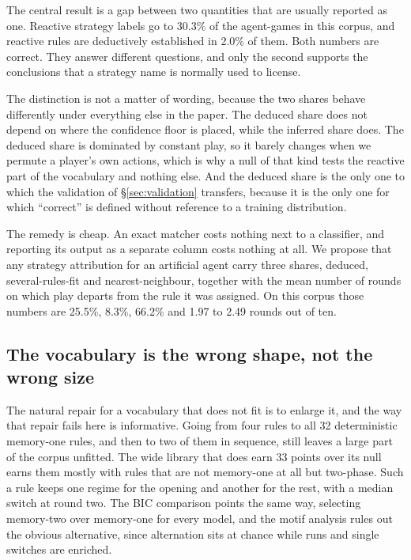 \documentclass[11pt,a4paper]{article}
\begin{document}
The central result is a gap between two quantities that are usually reported
as one. Reactive strategy labels go to 30.3\% of the agent-games in this
corpus, and reactive rules are deductively established in 2.0\% of them. Both
numbers are correct. They answer different questions, and only the second
supports the conclusions that a strategy name is normally used to license.

The distinction is not a matter of wording, because the two shares behave
differently under everything else in the paper. The deduced share does not
depend on where the confidence floor is placed, while the inferred share does.
The deduced share is dominated by constant play, so it barely changes when we
permute a player's own actions, which is why a null of that kind tests the
reactive part of the vocabulary and nothing else. And the deduced share is the
only one to which the validation of \S\ref{sec:validation} transfers, because
it is the only one for which ``correct'' is defined without reference to a
training distribution.

The remedy is cheap. An exact matcher costs nothing next to a classifier, and
reporting its output as a separate column costs nothing at all. We propose
that any strategy attribution for an artificial agent carry three shares,
deduced, several-rules-fit and nearest-neighbour, together with the mean
number of rounds on which play departs from the rule it was assigned. On this
corpus those numbers are 25.5\%, 8.3\%, 66.2\% and 1.97 to 2.49 rounds out of
ten.

\subsection{The vocabulary is the wrong shape, not the wrong size}

The natural repair for a vocabulary that does not fit is to enlarge it, and
the way that repair fails here is informative. Going from four rules to all 32
deterministic memory-one rules, and then to two of them in sequence, still
leaves a large part of the corpus unfitted. The wide library that does earn 33
points over its null earns them mostly with rules that are not memory-one at
all but two-phase. Such a rule keeps one regime for the opening and another
for the rest, with a median switch at round two. The BIC comparison points the
same way, selecting memory-two over memory-one for every model, and the motif
analysis rules out the obvious alternative, since alternation sits at chance
while runs and single switches are enriched.
\end{document}
